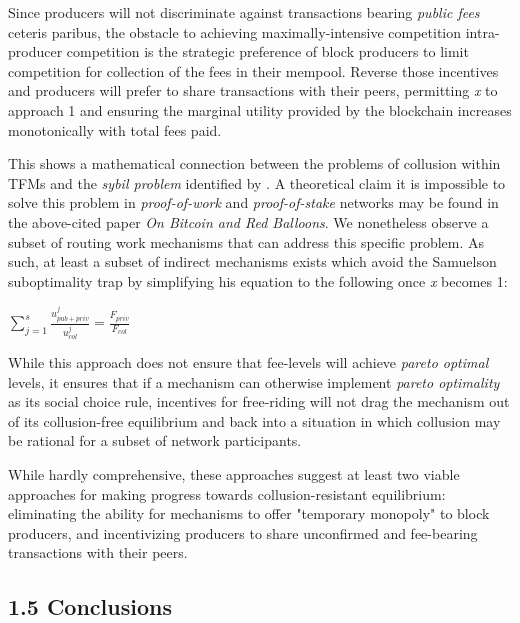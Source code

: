 \documentclass[oneside]{article}   	%
\begin{document}
Since producers will not discriminate against transactions bearing \textit{public fees} ceteris paribus, the obstacle to achieving maximally-intensive competition intra-producer competition is the strategic preference of block producers to limit competition for collection of the fees in their mempool. Reverse those incentives and producers will prefer to share transactions with their peers, permitting \textit{x} to approach 1 and ensuring the marginal utility provided by the blockchain increases monotonically with total fees paid.

This shows a mathematical connection between the problems of collusion within TFMs and the \textit{sybil problem} identified by \cite{babaioffredballoons}. A theoretical claim it is impossible to solve this problem in \textit{proof-of-work} and \textit{proof-of-stake} networks may be found in the above-cited paper \textit{On Bitcoin and Red Balloons}. We nonetheless observe a subset of routing work mechanisms that can address this specific problem. As such, at least a subset of indirect mechanisms exists which avoid the Samuelson suboptimality trap by simplifying his equation to the following once \textit{x} becomes 1:

\LARGE
\begin{adjustwidth}{1.5em}{1.5em}
\begin{math}
\sum_{j=1}^{s} \frac{u_{{pub}+{priv}}^j}{u_{col}^j} = \frac{F_{{priv}}}{F_{col}}
\end{math}
\end{adjustwidth}
\normalsize

While this approach does not ensure that fee-levels will achieve \textit{pareto optimal} levels, it ensures that if a mechanism can otherwise implement \textit{pareto optimality} as its social choice rule, incentives for free-riding will not drag the mechanism out of its collusion-free equilibrium and back into a situation in which collusion may be rational for a subset of network participants. 

While hardly comprehensive, these approaches suggest at least two viable approaches for making progress towards collusion-resistant equilibrium: eliminating the ability for mechanisms to offer "temporary monopoly" to block producers, and incentivizing producers to share unconfirmed and fee-bearing transactions with their peers.


\subsection*{1.5 Conclusions}
\end{document}
